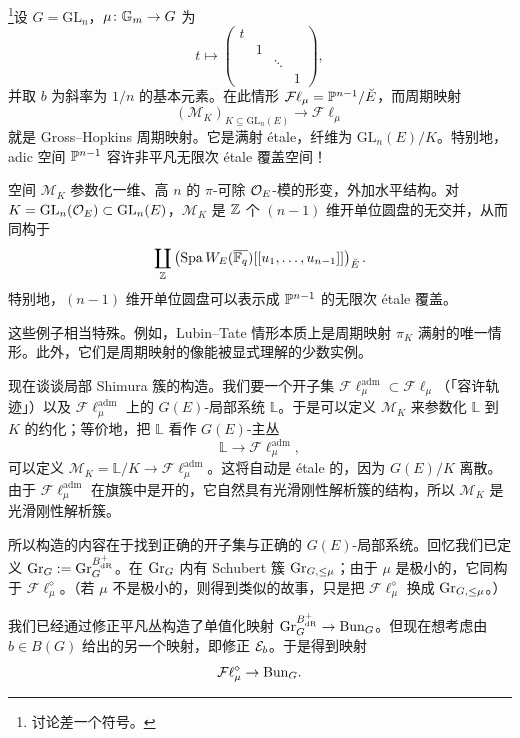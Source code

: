 \begin{example}
\footnote{讨论差一个符号。}设 $G=\mathrm{GL}_n$，$\mu\colon\mathbb{G}_m\to G$ 为
\[
t\mapsto\begin{pmatrix}
t & & & \\
& 1 & & \\
& & \ddots & \\
& & & 1
\end{pmatrix},
\]
并取 $b$ 为斜率为 $1/n$ 的基本元素。在此情形 $\mathcal{F}\ell_\mu=\mathbb{P}^{n-1}/\breve{E}$，而周期映射
\[
(\mathcal M_K)_{K\subseteq\mathrm{GL}_n(E)}\to\mathcal{F}\ell_\mu
\]
就是 Gross–Hopkins 周期映射。它是满射 étale，纤维为 $\mathrm{GL}_n(E)/K$。特别地，adic 空间 $\mathbb{P}^{n-1}$ 容许非平凡无限次 étale 覆盖空间！

空间 $\mathcal M_K$ 参数化一维、高 $n$ 的 $\pi$-可除 $\mathcal{O}_E$-模的形变，外加水平结构。对 $K=\mathrm{GL}_n(\mathcal{O}_E)\subset\mathrm{GL}_n(E)$，$\mathcal M_K$ 是 $\mathbb{Z}$ 个 $(n-1)$ 维开单位圆盘的无交并，从而同构于
\[
\coprod_{\mathbb{Z}}\left(\operatorname{Spa} W_E(\overline{\mathbb{F}_q})[[u_1,\dots,u_{n-1}]]\right)_{\breve{E}}.
\]
特别地，$(n-1)$ 维开单位圆盘可以表示成 $\mathbb{P}^{n-1}$ 的无限次 étale 覆盖。
\end{example}

\begin{remark}
这些例子相当特殊。例如，Lubin–Tate 情形本质上是周期映射 $\pi_K$ 满射的唯一情形。此外，它们是周期映射的像能被显式理解的少数实例。
\end{remark}

现在谈谈局部 Shimura 簇的构造。我们要一个开子集 $\mathcal{F}\ell^{\mathrm{adm}}_\mu\subset\mathcal{F}\ell_\mu$（「容许轨迹」）以及 $\mathcal{F}\ell^{\mathrm{adm}}_\mu$ 上的 $G(E)$-局部系统 $\mathbb L$。于是可以定义 $\mathcal M_K$ 来参数化 $\mathbb L$ 到 $K$ 的约化；等价地，把 $\mathbb L$ 看作 $G(E)$-主丛
\[
\mathbb L\to\mathcal{F}\ell^{\mathrm{adm}}_\mu,
\]
可以定义 $\mathcal M_K=\mathbb L/K\to\mathcal{F}\ell^{\mathrm{adm}}_\mu$。这将自动是 étale 的，因为 $G(E)/K$ 离散。由于 $\mathcal{F}\ell^{\mathrm{adm}}_\mu$ 在旗簇中是开的，它自然具有光滑刚性解析簇的结构，所以 $\mathcal M_K$ 是光滑刚性解析簇。

所以构造的内容在于找到正确的开子集与正确的 $G(E)$-局部系统。回忆我们已定义 $\mathrm{Gr}_G:=\mathrm{Gr}^{B^+_{\mathrm{dR}}}_G$。在 $\mathrm{Gr}_G$ 内有 Schubert 簇 $\mathrm{Gr}_{G,\le\mu}$；由于 $\mu$ 是极小的，它同构于 $\mathcal{F}\ell^{\diamond}_\mu$。（若 $\mu$ 不是极小的，则得到类似的故事，只是把 $\mathcal{F}\ell^{\diamond}_\mu$ 换成 $\mathrm{Gr}_{G,\le\mu}$。）


我们已经通过修正平凡丛构造了单值化映射 $\mathrm{Gr}^{B^+_{\mathrm{dR}}}_G\to\mathrm{Bun}_G$。但现在想考虑由 $b\in B(G)$ 给出的另一个映射，即修正 $\mathcal{E}_b$。于是得到映射
\[
\mathcal{F}\ell^{\diamond}_\mu\to\mathrm{Bun}_G.
\]

